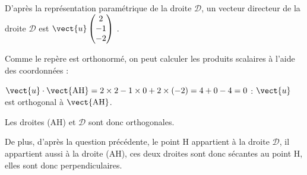 \begin{enumerate}
D'après la représentation paramétrique de la droite $\mathcal{D}$,  un vecteur directeur de la droite $\mathcal{D}$ est $\vect{u}\begin{pmatrix}2\\-1\\-2 \end{pmatrix}$ .

Comme le repère est orthonormé,  on peut calculer les produits scalaires à l'aide des coordonnées :

$ \vect{u}\cdot \vect{\mathrm{AH}} = 2\times 2 - 1 \times 0 + 2 \times (-2) = 4 + 0 - 4 = 0$ : $\vect{u}$ est orthogonal à $ \vect{\mathrm{AH}}$.

Les droites (AH) et $\mathcal{D}$ sont donc orthogonales.

De plus, d'après la question précédente, le point H appartient à la droite $\mathcal{D}$, il appartient aussi à la droite (AH), ces deux droites sont donc sécantes au point H, elles sont donc perpendiculaires.
\end{enumerate}

\bigskip
